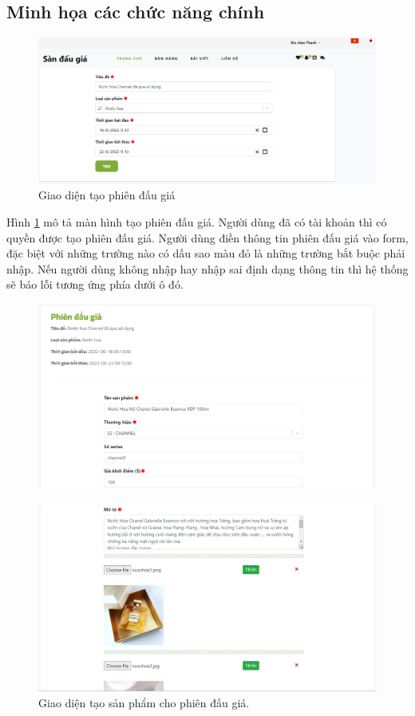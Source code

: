 \documentclass[../DoAn.tex]{subfiles}
\begin{document}
\subsection{Minh họa các chức năng chính}
\begin{figure}[H]
    \centering
    \includegraphics[width=0.75\linewidth,height=4.86cm]{Hinhve/createauctiondemo.png}
    \caption{Giao diện tạo phiên đấu giá}
    \label{fig:Fig414}
\end{figure}
Hình \ref{fig:Fig414} mô tả màn hình tạo phiên đấu giá. Người dùng đã có tài khoản thì có quyền được tạo phiên đấu giá. Người dùng điền thông tin phiên đấu giá vào form, đặc biệt với những trường nào có dấu sao màu đỏ là những trường bắt buộc phải nhập. Nếu người dùng không nhập hay nhập sai định dạng thông tin thì hệ thống sẽ báo lỗi tương ứng phía dưới ô đó. 
\begin{figure}[H]
    \centering
    \includegraphics[width=0.75\linewidth,height=6.16cm]{Hinhve/createitem1demo.png}
    \label{fig:Fig4151}
\end{figure}
\begin{figure}[H]
    \centering
    \includegraphics[width=0.75\linewidth,height=6.21cm]{Hinhve/createitem2demo.png}
    \caption{Giao diện tạo sản phẩm cho phiên đấu giá.}
    \label{fig:Fig415}
\end{figure}
\end{document}
